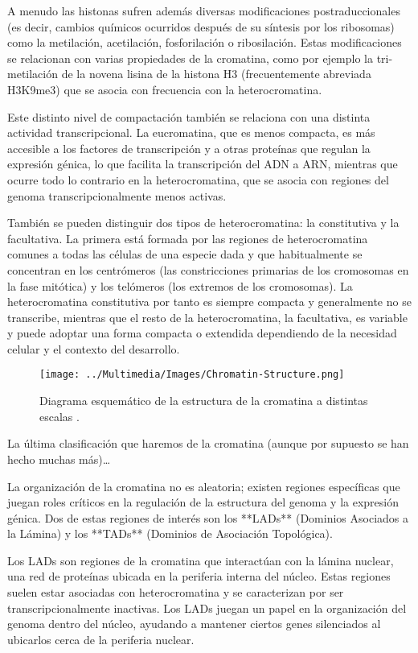 A menudo las histonas sufren además diversas modificaciones postraduccionales (es decir, cambios químicos ocurridos después de su síntesis por los ribosomas) como la metilación, acetilación, fosforilación o ribosilación. Estas modificaciones se relacionan con varias propiedades de la cromatina, como por ejemplo la tri-metilación de la novena lisina de la histona H3 (frecuentemente abreviada H3K9me3) que se asocia con frecuencia con la heterocromatina.

Este distinto nivel de compactación también se relaciona con una distinta actividad transcripcional. La eucromatina, que es menos compacta, es más accesible a los factores de transcripción y a otras proteínas que regulan la expresión génica, lo que facilita la transcripción del ADN a ARN, mientras que ocurre todo lo contrario en la heterocromatina, que se asocia con regiones del genoma transcripcionalmente menos activas.

También se pueden distinguir dos tipos de heterocromatina: la constitutiva y la facultativa. La primera está formada por las regiones de heterocromatina comunes a todas las células de una especie dada y que habitualmente se concentran en los centrómeros (las constricciones primarias de los cromosomas en la fase mitótica) y los telómeros (los extremos de los cromosomas). La heterocromatina constitutiva por tanto es siempre compacta y generalmente no se transcribe, mientras que el resto de la heterocromatina, la facultativa, es variable y puede adoptar una forma compacta o extendida dependiendo de la necesidad celular y el contexto del desarrollo.

\begin{figure}
    \centering
    \texttt{[image: ../Multimedia/Images/Chromatin-Structure.png]}
    \caption{Diagrama esquemático de la estructura de la cromatina a distintas escalas \cite{Felsenfeld2003}.}
    \label{fig:chromatin-structure}
\end{figure}

La última clasificación que haremos de la cromatina (aunque por supuesto se han hecho muchas más)\dots

La organización de la cromatina no es aleatoria; existen regiones específicas que juegan roles críticos en la regulación de la estructura del genoma y la expresión génica. Dos de estas regiones de interés son los **LADs** (Dominios Asociados a la Lámina) y los **TADs** (Dominios de Asociación Topológica).

Los LADs son regiones de la cromatina que interactúan con la lámina nuclear, una red de proteínas ubicada en la periferia interna del núcleo. Estas regiones suelen estar asociadas con heterocromatina y se caracterizan por ser transcripcionalmente inactivas. Los LADs juegan un papel en la organización del genoma dentro del núcleo, ayudando a mantener ciertos genes silenciados al ubicarlos cerca de la periferia nuclear.

